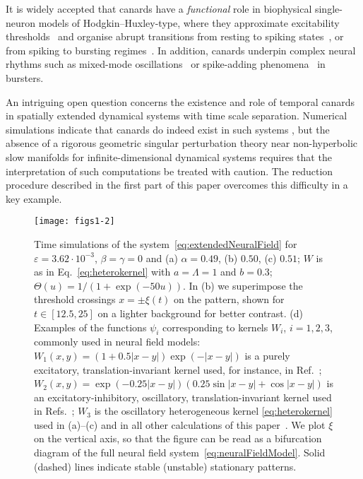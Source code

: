 \documentclass[aps,prl,reprint,superscriptaddress]{revtex4-1}
\newcommand{\edits}[1]{#1}
\begin{document}
It is widely accepted that canards have a \emph{functional} role in
biophysical single-neuron models of Hodgkin--Huxley-type, where they
approximate excitability thresholds~\cite{Desroches2013b,Mitry2013}
and organise abrupt transitions from resting to spiking
states~\cite{Moehlis2006}, or from spiking to bursting
regimes~\cite{Kramer2008,Rinzel1986}. In addition, canards underpin
complex neural rhythms such as mixed-mode
oscillations~\cite{Desroches2012} or spike-adding
phenomena~\cite{Desroches2013} \edits{in bursters}.

\edits{An intriguing open question concerns the existence and role of temporal 
canards in spatially extended dynamical systems with time scale separation. 
Numerical simulations indicate that canards do indeed exist in such systems 
\cite{Gandhi16}, but the absence of a rigorous geometric singular perturbation 
theory near non-hyperbolic slow manifolds for infinite-dimensional dynamical 
systems requires that the interpretation of such computations be treated with 
caution. The reduction procedure described in the first part of this paper 
overcomes this difficulty in a key example.}

\begin{figure*}
  \texttt{[image: figs1-2]}
  \caption{Time simulations of the system~\eqref{eq:extendedNeuralField} for
  $\varepsilon=3.62\!\cdot\!10^{-3}$, $\beta\!=\!\gamma\!=\!0$ and (a) $\alpha\!=0.49$,
  (b) $0.50$, (c) $0.51$; $W$ is as in Eq.~\eqref{eq:heterokernel} with $a=\Lambda=1$
  and $b=0.3$; $\Theta(u)=1/(1+\exp(-50u))$. In (b) we superimpose the threshold crossings
  $x=\pm \xi(t)$ on the pattern, shown for $t\in [12.5,25]$ on a lighter background 
  for better contrast. (d) Examples of the functions
  $\psi_i$ corresponding to kernels $W_i$, $i=1,2,3$, commonly used in neural field
  models: $W_1(x,y)=(1+0.5|x-y|)\exp(-|x-y|)$ is a purely excitatory,
  translation-invariant kernel used, for instance, in Ref.~\cite{Coombes2005aa};
  $W_2(x,y)= \exp(-0.25|x-y|)(0.25 \sin |x-y| + \cos |x-y|)$ is an
  excitatory-inhibitory, oscillatory, translation-invariant kernel used in
  Refs.~\cite{Laing2003aa,Rankin:2014bz}; $W_3$ is the oscillatory heterogeneous
  kernel \eqref{eq:heterokernel} used in (a)--(c) and in all other calculations of
  this paper~\cite{Bressloff:2001ck,Coombes2011aa,Avitabile2015aa}. We plot $\xi$
  on the vertical axis, so that the figure can be read as a bifurcation diagram of
  the full neural field system~\eqref{eq:neuralFieldModel}. Solid (dashed) lines
  indicate stable (unstable) stationary patterns.} 
  \label{fig:figs1-2}
\end{figure*}
\end{document}
